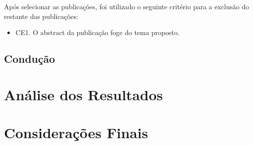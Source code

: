 \documentclass[12pt]{article}
\begin{document}
Após selecionar as publicações, foi utilizado o seguinte critério para a exclusão do restante das publicações:

\begin{itemize}
  \item CE1. O abstract da publicação foge do tema proposto.
\end{itemize}



\subsection{Condução}

\section{Análise dos Resultados}

\section{Considerações Finais}



\end{document}
